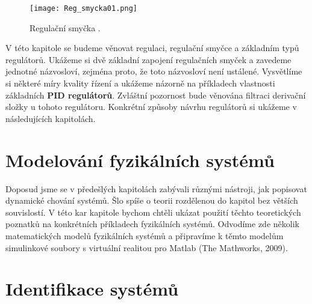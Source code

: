     \begin{figure}[ht!] %
      \centering
      \texttt{[image: Reg\_smycka01.png]}
      \caption{Regulační smyčka \cite[s.~215]{Roubal2011}.}
      \label{tky:fig_feedback003}
    \end{figure}
    V této kapitole se budeme věnovat regulaci, regulační smyčce a základním typů regulátorů. 
    Ukážeme si dvě základní zapojení regulačních smyček a zavedeme jednotné názvosloví, zejména 
    proto, že toto názvosloví není ustálené. Vysvětlíme si některé míry kvality řízení a ukážeme 
    názorně na příkladech vlastnosti základních \textbf{PID regulátorů}. Zvláštní pozornost bude 
    věnována filtraci derivační složky u tohoto regulátoru. Konkrétní způsoby návrhu regulátorů si 
    ukážeme v následujících kapitolách.
    
  
  \section{Modelování fyzikálních systémů}\label{TKY:sec002}
    Doposud jsme se v předešlých kapitolách zabývali různými nástroji, jak popisovat dynamické 
    chování systémů. Šlo spíše o teorii rozdělenou do kapitol bez větších souvislostí. V této kar 
    kapitole bychom chtěli ukázat použití těchto teoretických poznatků na konkrétních příkladech 
    fyzikálních systémů. Odvodíme zde několik matematických modelů fyzikálních systémů a připravíme 
    k těmto modelům simulinkové soubory s virtuální realitou pro Matlab (The Mathworks, 2009).
    
  \section{Identifikace systémů}\label{TKY:sec003}

